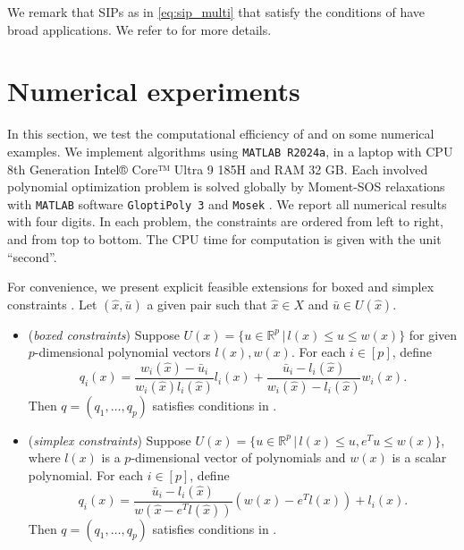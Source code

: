 \documentclass{amsart}
\theoremstyle{plain}
\newcommand{\re}{\mathbb{R}}
\newcommand{\mc}[1]{\mathcal{#1}}
\numberwithin{equation}{section}
\begin{document}
		We remark that SIPs as in \eqref{eq:sip_multi} that satisfy the conditions
        of  have broad applications.
		We refer to  for more details.
		
		
		
		
		
		\section{Numerical experiments}	
		\label{sc:num}
		In this section, we test the computational efficiency of  and 
		on some numerical examples. 
		We implement algorithms using \texttt{MATLAB R2024a},
		in a laptop with CPU 8th Generation Intel® Core™ Ultra 9 185H and RAM 32 GB.
		Each involved polynomial optimization problem is solved globally by 
		Moment-SOS relaxations with \texttt{MATLAB} software {\tt GloptiPoly 3} \cite{GloPol3} 
		and {\tt Mosek} \cite{mosek}.
		We report all numerical results with four digits.
		In each problem, the constraints are ordered from left to right, 
		and from top to bottom.
		The CPU time for computation is given with the unit ``second''.
		
		For convenience, we present explicit feasible extensions for boxed and 
		simplex constraints \cite{HuNie23}. Let $(\hat{x}, \bar{u})$ a given pair such that 
		$\hat{x}\in X$ and $\bar{u}\in U(\hat{x})$.
		\begin{itemize}
			\item (\emph{boxed constraints}) 
			Suppose $U(x) = \{u\in\re^p\,\vert\, l(x)\le u\le w(x)\}$
			for given $p$-dimensional polynomial vectors $l(x), w(x)$.
			For each $i\in [p]$, define
			\[
			q_i(x) = \frac{w_i(\hat{x})-\bar{u}_i}{w_i(\hat{x})l_i(\hat{x})} l_i(x)
			+\frac{\bar{u}_i-l_i(\hat{x})}{w_i(\hat{x})-l_i(\hat{x})}w_i(x).
			\]
			Then $q = (q_1,\ldots, q_p)$ satisfies conditions in .
			\item (\emph{simplex constraints})
			Suppose $U(x) = \{u\in\re^p\,\vert\, l(x)\le u, e^Tu\le w(x)\}$,
			where $l(x)$ is a $p$-dimensional vector of polynomials and 
			$w(x)$ is a scalar polynomial.
			For each $i\in [p]$, define
			\[
			q_i(x) = \frac{\bar{u}_i-l_i(\hat{x})}{w(\hat{x}-e^Tl(\hat{x}))}
			(w(x)-e^Tl(x))+l_i(x).
			\]
			Then $q = (q_1,\ldots, q_p)$ satisfies conditions in .
		\end{itemize}
		
\end{document}
